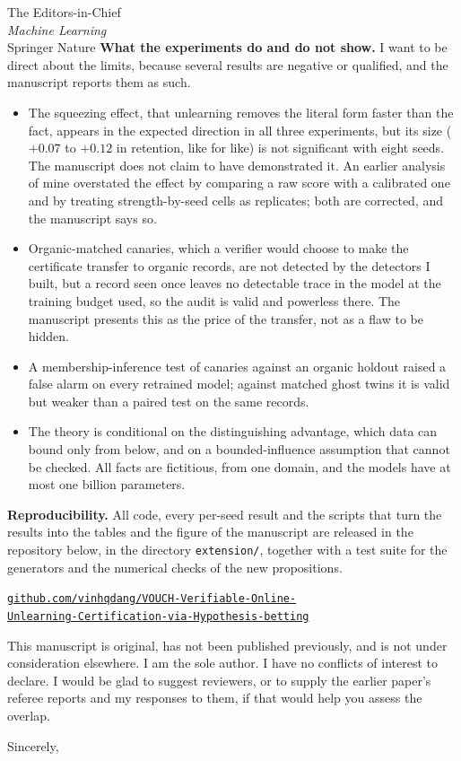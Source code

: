 \documentclass[10pt,a4paper]{letter}
\begin{document}
\begin{letter}{The Editors-in-Chief\\\emph{Machine Learning}\\Springer Nature}
\textbf{What the experiments do and do not show.} I want to be direct about the limits,
because several results are negative or qualified, and the manuscript reports them as such.
\begin{itemize}
\item The squeezing effect, that unlearning removes the literal form faster than the
fact, appears in the expected direction in all three experiments, but its size
($+0.07$ to $+0.12$ in retention, like for like) is not significant with eight seeds.
The manuscript does not claim to have demonstrated it. An earlier analysis of mine
overstated the effect by comparing a raw score with a calibrated one and by treating
strength-by-seed cells as replicates; both are corrected, and the manuscript says so.
\item Organic-matched canaries, which a verifier would choose to make the certificate
transfer to organic records, are not detected by the detectors I built, but a record seen
once leaves no detectable trace in the model at the training budget used, so the audit is
valid and powerless there. The manuscript presents this as the price of the transfer, not
as a flaw to be hidden.
\item A membership-inference test of canaries against an organic holdout raised a false
alarm on every retrained model; against matched ghost twins it is valid but weaker than a
paired test on the same records.
\item The theory is conditional on the distinguishing advantage, which data can bound
only from below, and on a bounded-influence assumption that cannot be checked. All facts
are fictitious, from one domain, and the models have at most one billion parameters.
\end{itemize}

\textbf{Reproducibility.} All code, every per-seed result and the scripts that turn the
results into the tables and the figure of the manuscript are released in the repository
below, in the directory \texttt{extension/}, together with a test suite for the
generators and the numerical checks of the new propositions.
\begin{center}
\href{https://github.com/vinhqdang/VOUCH-Verifiable-Online-Unlearning-Certification-via-Hypothesis-betting}{\texttt{github.com/vinhqdang/VOUCH-Verifiable-Online-}\\\texttt{Unlearning-Certification-via-Hypothesis-betting}}
\end{center}

This manuscript is original, has not been published previously, and is not under
consideration elsewhere. I am the sole author. I have no conflicts of interest to declare.
I would be glad to suggest reviewers, or to supply the earlier paper's referee reports and
my responses to them, if that would help you assess the overlap.

\closing{Sincerely,}

\end{letter}
\end{document}
